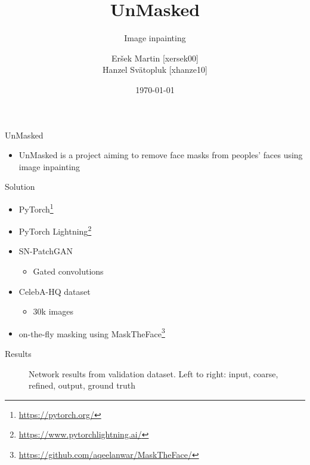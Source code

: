 \documentclass[10pt,xcolor=pdflatex]{beamer}
\title{UnMasked}
\subtitle{Image inpainting}
\author{Eršek Martin [xersek00]\\ Hanzel Svätopluk [xhanze10]}
\institute{Brno University of Technology, Faculty of Information Technology}
\date{\today}
\begin{document}
	\frame[plain]{\titlepage}
	
	\begin{frame}{UnMasked}
		\begin{itemize}
			\item UnMasked is a project aiming to remove face masks from peoples' faces using image inpainting
		\end{itemize}
	\end{frame}

	\begin{frame}{Solution}
		\begin{itemize}
			\item PyTorch\footnote{\url{https://pytorch.org/}}
			\item PyTorch Lightning\footnote{\url{https://www.pytorchlightning.ai/}}
			\item SN-PatchGAN \cite{yu2018free}
				\begin{itemize}
					\item Gated convolutions
				\end{itemize}
			\item CelebA-HQ dataset
				\begin{itemize}
					\item 30k images
				\end{itemize}
			\item on-the-fly masking using MaskTheFace\footnote{\url{https://github.com/aqeelanwar/MaskTheFace/}} \cite{anwar2020masked}
		\end{itemize}
	\end{frame}

	\begin{frame}{Results}
		\begin{figure}
			\centering
			\caption{Network results from validation dataset. Left to right: input, coarse, refined, output, ground truth}
			\label{fig:unmasked-results}
		\end{figure}
	\end{frame}
\end{document}
